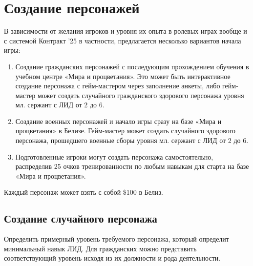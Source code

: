 \documentclass[
]{article}
\begin{document}
\section{Создание
персонажей}\label{ux441ux43eux437ux434ux430ux43dux438ux435-ux43fux435ux440ux441ux43eux43dux430ux436ux435ux439}

В зависимости от желания игроков и уровня их опыта в ролевых играх
вообще и с системой Контракт '25 в частности, предлагается несколько
вариантов начала игры:

\begin{enumerate}
\def\labelenumi{\arabic{enumi}.}
\item
  Создание гражданских персонажей с последующим прохождением обучения в
  учебном центре «Мира и процветания». Это может быть интерактивное
  создание персонажа с гейм-мастером через заполнение анкеты, либо
  гейм-мастер может создать случайного гражданского здорового персонажа
  уровня мл. сержант с ЛИД от 2 до 6.
\item
  Создание военных персонажей и начало игры сразу на базе «Мира и
  процветания» в Белизе. Гейм-мастер может создать случайного здорового
  персонажа, прошедшего военные сборы уровня мл. сержант с ЛИД от 2 до
  6.
\item
  Подготовленные игроки могут создать персонажа самостоятельно,
  распределив 25 очков тренированности по любым навыкам для старта на
  базе «Мира и процветания».
\end{enumerate}

Каждый персонаж может взять с собой \$100 в Белиз.

\subsection{Создание случайного
персонажа}\label{ux441ux43eux437ux434ux430ux43dux438ux435-ux441ux43bux443ux447ux430ux439ux43dux43eux433ux43e-ux43fux435ux440ux441ux43eux43dux430ux436ux430}

Определить примерный уровень требуемого персонажа, который определит
минимальный навык ЛИД. Для гражданских можно представить соответствующий
уровень исходя из их должности и рода деятельности.
\end{document}
